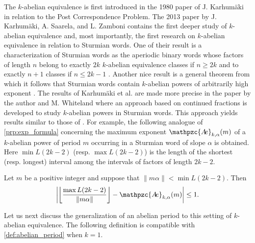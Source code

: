 \documentclass[a4paper,fleqn]{article}
\providecommand{\Abs}[1]{\left\lvert#1\right\rvert}
\providecommand{\norm}[1]{\lVert#1\rVert}
\providecommand{\Floor}[1]{\left\lfloor#1\right\rfloor}
\newcommand{\abexp}[2][]{\mathpzc{A\mkern-3mu e}_{#1}(#2)}
\begin{document}
  The $k$-abelian equivalence is first introduced in the 1980 paper of J. Karhumäki
  \cite{1980:generalized_parikh_mappings_and_homomorphisms} in relation to the Post Correspondence Problem. The 2013
  paper \cite{2013:on_a_generalization_of_abelian_equivalence_and_complexity_of_infinite} by J. Karhumäki, A. Saarela,
  and L. Zamboni contains the first deeper study of $k$-abelian equivalence and, most importantly, the first research
  on $k$-abelian equivalence in relation to Sturmian words. One of their result is a characterization of Sturmian words
  as the aperiodic binary words whose factors of length $n$ belong to exactly $2k$ $k$-abelian equivalence classes if
  $n \geq 2k$ and to exactly $n + 1$ classes if $n \leq 2k - 1$
  \cite[Thm.~4.1]{2013:on_a_generalization_of_abelian_equivalence_and_complexity_of_infinite}. Another nice result is a
  general theorem from which it follows that Sturmian words contain $k$-abelian powers of arbitrarily high exponent
  \cite[Thm.~5.4]{2013:on_a_generalization_of_abelian_equivalence_and_complexity_of_infinite}. The results of Karhumäki
  et al. are made more precise in the paper \cite{2019:on_k-abelian_equivalence_and_generalized_lagrange_spectra} by
  the author and M. Whiteland where an approach based on continued fractions is developed to study $k$-abelian powers
  in Sturmian words. This approach yields results similar to those of
  \cite{2016:abelian_powers_and_repetitions_in_sturmian_words}. For example, the following analogue of
  \autoref{prp:exp_formula} concerning the maximum exponent $\abexp[k,\alpha]{m}$ of a $k$-abelian power of period $m$
  occurring in a Sturmian word of slope $\alpha$ is obtained. Here $\min L(2k-2)$ (resp. $\max L(2k-2)$) is the length
  of the shortest (resp. longest) interval among the intervals of factors of length $2k-2$.

  \begin{proposition}\cite[Lemma~3.10]{2019:on_k-abelian_equivalence_and_generalized_lagrange_spectra}
    Let $m$ be a positive integer and suppose that $\norm{m\alpha} < \min L(2k-2)$. Then
    \begin{equation*}
      \Abs{\Floor{\frac{\max L(2k-2)}{\norm{m\alpha}}} - \abexp[k,\alpha]{m}} \leq 1.
    \end{equation*}
  \end{proposition}

  Let us next discuss the generalization of an abelian period to this setting of $k$-abelian equivalence. The following
  definition is compatible with \autoref{def:abelian_period} when $k = 1$.
\end{document}
